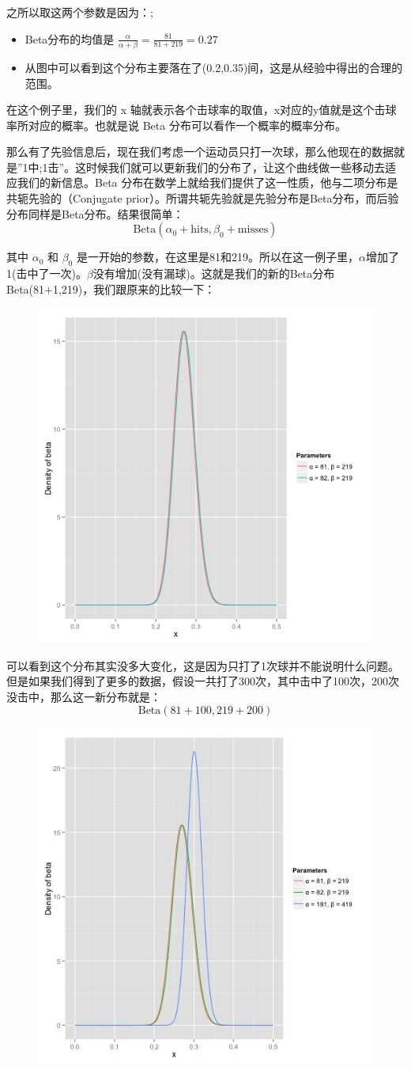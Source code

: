 \documentclass[12pt]{article}
\begin{document}
之所以取这两个参数是因为：;
\begin{itemize}
    \item Beta分布的均值是 $\frac{\alpha}{\alpha+\beta} = \frac{81}{81+219} = 0.27$
    \item 从图中可以看到这个分布主要落在了(0.2,0.35)间，这是从经验中得出的合理的范围。
\end{itemize}

在这个例子里，我们的 x 轴就表示各个击球率的取值，x对应的y值就是这个击球率所对应的概率。也就是说 Beta 分布可以看作一个概率的概率分布。

那么有了先验信息后，现在我们考虑一个运动员只打一次球，那么他现在的数据就是”1中;1击”。这时候我们就可以更新我们的分布了，让这个曲线做一些移动去适应我们的新信息。Beta 分布在数学上就给我们提供了这一性质，他与二项分布是共轭先验的（Conjugate prior）。所谓共轭先验就是先验分布是Beta分布，而后验分布同样是Beta分布。结果很简单：
$$
\text{Beta}(\alpha_0 + \text{hits}, \beta_0 + \text{misses})
$$

其中 $\alpha_0$ 和 $\beta_0$ 是一开始的参数，在这里是81和219。所以在这一例子里，$\alpha$增加了1(击中了一次)。$\beta$没有增加(没有漏球)。这就是我们的新的Beta分布 Beta(81+1,219)，我们跟原来的比较一下：
\begin{figure}[H]
  \centering
  \includegraphics[width=.5\textwidth]{fig/Beta_Distribution_Example_2.png} 
\end{figure}

可以看到这个分布其实没多大变化，这是因为只打了1次球并不能说明什么问题。但是如果我们得到了更多的数据，假设一共打了300次，其中击中了100次，200次没击中，那么这一新分布就是：
$$
\text{Beta}(81+100, 219+200)
$$
\begin{figure}[H]
  \centering
  \includegraphics[width=.5\textwidth]{fig/Beta_Distribution_Example_3.jpg} 
\end{figure}
\end{document}
